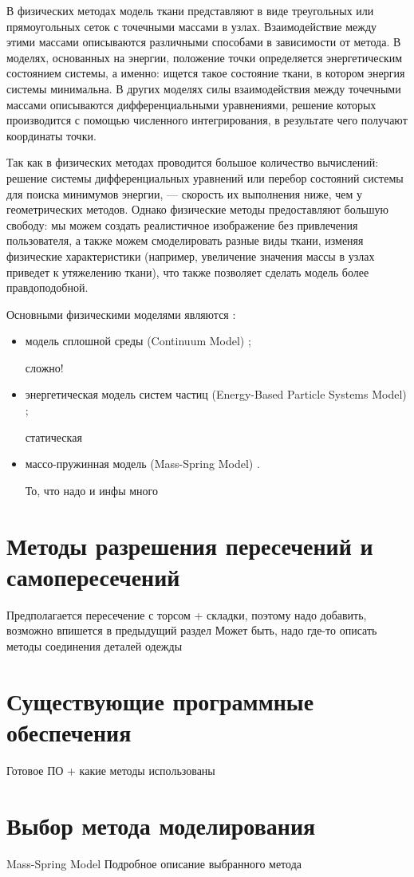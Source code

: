 В физических методах модель ткани представляют в виде  треугольных или
прямоугольных сеток с точечными массами в узлах. Взаимодействие между этими
массами  описываются различными способами в зависимости от метода. В моделях,
основанных на энергии, положение точки определяется энергетическим состоянием
системы, а именно: ищется такое состояние ткани, в котором энергия системы
минимальна. В других моделях силы взаимодействия между точечными массами
описываются дифференциальными уравнениями, решение которых производится с
помощью численного интегрирования, в результате чего получают координаты точки.
\cite{bib07}

Так как в физических методах проводится большое количество вычислений: решение
системы дифференциальных уравнений или перебор состояний системы для поиска
минимумов энергии, --- скорость их выполнения ниже, чем у геометрических
методов. Однако физические методы предоставляют большую свободу: мы можем
создать реалистичное изображение без привлечения пользователя, а также можем
смоделировать разные виды ткани, изменяя физические характеристики (например,
увеличение значения массы в узлах приведет к утяжелению ткани), что также
позволяет сделать модель более правдоподобной. \cite{bib07}

Основными физическими моделями являются \cite{bib11}:
\begin{itemize}[left=\parindent]
    \item модель сплошной среды (Continuum Model) \cite{bib12};

        сложно!

    \item энергетическая модель систем частиц (Energy-Based Particle Systems Model) \cite{bib13};

        статическая

    \item массо-пружинная модель (Mass-Spring Model) \cite{bib14}.

        То, что надо и инфы много

\end{itemize}

\section{Методы разрешения пересечений и самопересечений}

Предполагается пересечение с торсом + складки, поэтому надо добавить, возможно
впишется в предыдущий раздел
Может быть, надо где-то описать методы соединения деталей одежды

\section{Существующие программные обеспечения}

Готовое ПО + какие методы использованы

\section{Выбор метода моделирования}

Mass-Spring Model 
Подробное описание выбранного метода
